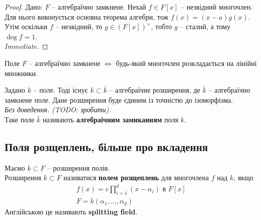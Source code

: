 \documentclass{math_library}
\begin{document}
\begin{proof}
\rightproof Дано: $F$ -- алгебраїчно замкнене. Нехай $f \in F[x]$ -- незвідний многочлен. Для нього виконується основна теорема алгебри, тож $f(x) = (x-a)g(x)$. Утім оскільки $f$ -- незвідний, то $g \in (F[x])^\times$, тобто $g$ -- сталий, а тому $\deg f = 1$.
\bigskip \\
\leftproof \textit{Immediate.}
\end{proof}

\begin{corollary}
Поле $F$ -- алгебраїчно замкнене $\iff$ будь-який многочлен розкладається на лінійні множники.
\end{corollary}

\begin{theorem}
Задано $k$ -- поле. Тоді існує $k \subset \bar{k}$ -- алгебраїчне розширення, де $\bar{k}$ -- алгебраїчно замкнене поле. Дане розширення буде єдиним із точністю до ізоморфізма.\\
\textit{Без доведення. (TODO: зробити).}
\bigskip \\
Таке поле $\bar{k}$ називають \textbf{алгебраїчним замиканням} поля $k$.
\end{theorem}

\subsection{Поля розщеплень, більше про вкладення}

\begin{definition}
Маємо $k \subset F$ -- розширення полів.\\
Розширення $k \subset F$ називатися \textbf{полем розщеплень} для многочлена $f$ над $k$, якщо
\begin{align*}
f(x) = c \prod_{i=1}^d (x-\alpha_i) \text{ в } F[x] \\
F = k(\alpha_1,\dots,\alpha_d)
\end{align*}
Англійською це називають \textbf{splitting field}.
\end{definition}
\end{document}
